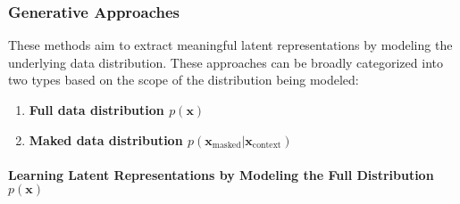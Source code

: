 \subsubsection{Generative Approaches}

These methods aim to extract meaningful latent representations by modeling the underlying data distribution. These approaches can be broadly categorized into two types based on the scope of the distribution being modeled:
\begin{enumerate}
    \item \textbf{Full data distribution $p(\textbf{x})$}
    \item \textbf{Maked data distribution $p(\mathbf{x}_{\text{masked}}|\textbf{x}_{\text{context}})$}
\end{enumerate}

\paragraph{Learning Latent Representations by Modeling the Full Distribution $p(\textbf{x})$}


